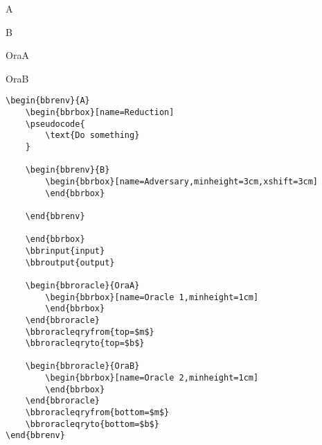 \documentclass[a4paper]{report}
\begin{document}
\begin{bbrenv}{A}
	\begin{bbrbox}[name=Reduction]

	\begin{bbrenv}{B}
		\begin{bbrbox}[name=Adversary,minheight=3cm,xshift=3cm]
		\end{bbrbox}

	\end{bbrenv}

	\end{bbrbox}

	\begin{bbroracle}{OraA}
		\begin{bbrbox}[name=Oracle 1,minheight=1cm]
		\end{bbrbox}
	\end{bbroracle}

	\begin{bbroracle}{OraB}
		\begin{bbrbox}[name=Oracle 2,minheight=1cm]
		\end{bbrbox}
	\end{bbroracle}
\end{bbrenv}

\begin{lstlisting}
\begin{bbrenv}{A}
	\begin{bbrbox}[name=Reduction]
	\pseudocode{
		\text{Do something} 
	}

	\begin{bbrenv}{B}
		\begin{bbrbox}[name=Adversary,minheight=3cm,xshift=3cm]
		\end{bbrbox}

	\end{bbrenv}

	\end{bbrbox}
	\bbrinput{input}
	\bbroutput{output}

	\begin{bbroracle}{OraA}
		\begin{bbrbox}[name=Oracle 1,minheight=1cm]
		\end{bbrbox}
	\end{bbroracle}
	\bbroracleqryfrom{top=$m$}
	\bbroracleqryto{top=$b$}

	\begin{bbroracle}{OraB}
		\begin{bbrbox}[name=Oracle 2,minheight=1cm]
		\end{bbrbox}
	\end{bbroracle}
	\bbroracleqryfrom{bottom=$m$}
	\bbroracleqryto{bottom=$b$}
\end{bbrenv}
\end{lstlisting}
\end{document}
